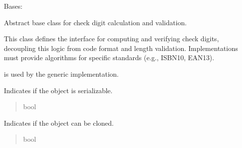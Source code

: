 \documentclass[letterpaper,10pt,english]{sphinxmanual}
\begin{document}
\begin{fulllineitems}
\label{\detokenize{apache_commons_validator_python.routines.checkdigit:apache_commons_validator_python.routines.checkdigit.checkdigit.CheckDigit}}
\pysigstartsignatures
{}
\pysigstopsignatures
\sphinxAtStartPar
Bases: 

\sphinxAtStartPar
Abstract base class for check digit calculation and validation.

\sphinxAtStartPar
This class defines the interface for computing and verifying check digits,
decoupling this logic from code format and length validation. Implementations
must provide algorithms for specific standards (e.g., ISBN\sphinxhyphen{}10, EAN\sphinxhyphen{}13).

\sphinxAtStartPar
{} is used by the generic  implementation.

\begin{fulllineitems}
\label{\detokenize{apache_commons_validator_python.routines.checkdigit:apache_commons_validator_python.routines.checkdigit.checkdigit.CheckDigit.serializable}}
\pysigstartsignatures
{}
\pysigstopsignatures
\sphinxAtStartPar
Indicates if the object is serializable.
\begin{quote}\begin{description}
\sphinxAtStartPar
bool

\end{description}\end{quote}

\end{fulllineitems}


\begin{fulllineitems}
\label{\detokenize{apache_commons_validator_python.routines.checkdigit:apache_commons_validator_python.routines.checkdigit.checkdigit.CheckDigit.clone}}
\pysigstartsignatures
{}
\pysigstopsignatures
\sphinxAtStartPar
Indicates if the object can be cloned.
\begin{quote}\begin{description}
\sphinxAtStartPar
bool


\end{description}
\end{quote}
\end{fulllineitems}
\end{fulllineitems}
\end{document}
